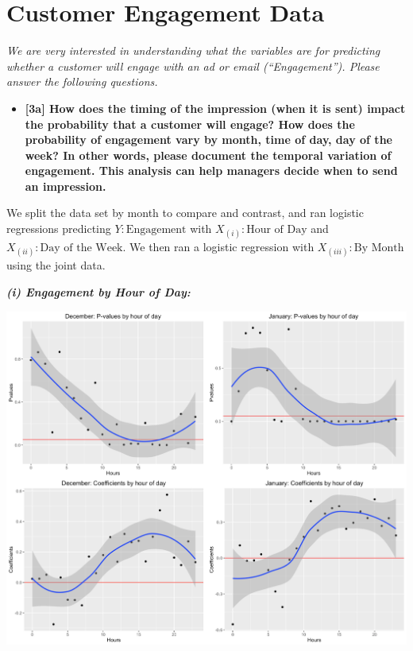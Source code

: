 \documentclass[10pt, oneside,spanish]{article}
\begin{document}
 







\pagebreak

\section{Customer Engagement Data}

\textit{ We are very interested in understanding what the variables are for predicting whether a customer will engage with an ad or email (“Engagement”). Please answer the following questions.}

\begin{itemize}
\item \textbf{[3a] How does the timing of the impression (when it is sent) impact the probability that a customer will engage? How does the probability of engagement vary by month, time of day, day of the week? In other words, please document the temporal variation of engagement. This analysis can help managers decide when to send an impression.   }
\end{itemize}

We split the data set by month to compare and contrast, and ran logistic regressions predicting $Y: \textrm{Engagement}$ with $X_{(i)}: \textrm{Hour of Day} $ and $X_{(ii)}: \textrm{Day of the Week} $. We then ran a logistic regression with $X_{(iii)}: \textrm{By Month} $ using the joint data. 

\textbf{\textit{(i) Engagement by Hour of Day:}}
\begin{center}
\includegraphics[width=14cm]{hod.png}
\end{center}
\end{document}
